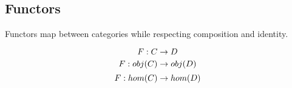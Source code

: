 \documentclass[../../notes.tex]{subfiles}
\begin{document}
\subsection{Functors}
\begin{definition}

  Functors map between categories while respecting composition and identity.

  $$ F : C \rightarrow D $$
  $$ F : obj(C) \rightarrow obj(D) $$
  $$ F : hom(C) \rightarrow hom(D) $$

\end{definition}

\end{document}
